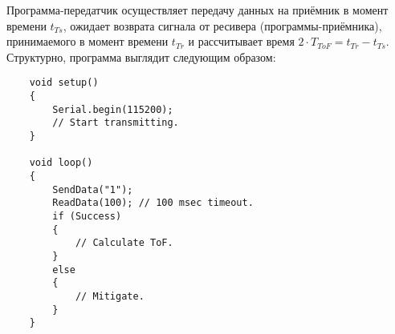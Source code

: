 Программа-передатчик осуществляет передачу данных на приёмник в момент времени $t_{Ts}$, ожидает возврата сигнала от ресивера (программы-приёмника), принимаемого в момент времени $t_{Tr}$ и рассчитывает время $2 \cdot T_{ToF} = t_{Tr} - t_{Ts}$. Структурно, программа выглядит следующим образом:
\begin{verbatim}
    void setup()
    {
        Serial.begin(115200);
        // Start transmitting.
    }

    void loop()
    {
        SendData("1");
        ReadData(100); // 100 msec timeout.
        if (Success)
        {
            // Calculate ToF.
        }
        else
        {
            // Mitigate.
        }
    }
\end{verbatim}
